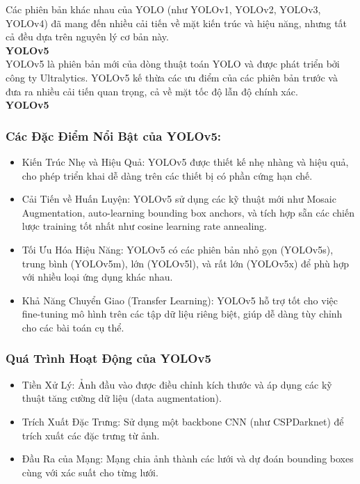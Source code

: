 \begin{flushleft}
\begin{itemize}
    \end{itemize}
    Các phiên bản khác nhau của YOLO (như YOLOv1, YOLOv2, YOLOv3, YOLOv4) đã mang đến nhiều cải tiến về mặt kiến trúc và hiệu năng, nhưng tất cả đều dựa trên nguyên lý cơ bản này.\\
    \textbf{YOLOv5}\\
    YOLOv5 là phiên bản mới của dòng thuật toán YOLO và được phát triển bởi công ty Ultralytics. YOLOv5 kế thừa các ưu điểm của các phiên bản trước và đưa ra nhiều cải tiến quan trọng, cả về mặt tốc độ lẫn độ chính xác.\\
    \textbf{YOLOv5}\\
    \fontsize{13}{20}\selectfont\subsubsection{Các Đặc Điểm Nổi Bật của YOLOv5:}
    \begin{itemize}
        \item Kiến Trúc Nhẹ và Hiệu Quả: YOLOv5 được thiết kế nhẹ nhàng và hiệu quả, cho phép triển khai dễ dàng trên các thiết bị có phần cứng hạn chế.
        \item Cải Tiến về Huấn Luyện: YOLOv5 sử dụng các kỹ thuật mới như Mosaic Augmentation, auto-learning bounding box anchors, và tích hợp sẵn các chiến lược training tốt nhất như cosine learning rate annealing.
        \item Tối Ưu Hóa Hiệu Năng: YOLOv5 có các phiên bản nhỏ gọn (YOLOv5s), trung bình (YOLOv5m), lớn (YOLOv5l), và rất lớn (YOLOv5x) để phù hợp với nhiều loại ứng dụng khác nhau.
        \item Khả Năng Chuyển Giao (Transfer Learning): YOLOv5 hỗ trợ tốt cho việc fine-tuning mô hình trên các tập dữ liệu riêng biệt, giúp dễ dàng tùy chỉnh cho các bài toán cụ thể.
    \end{itemize}
    \fontsize{13}{20}\selectfont\subsubsection{Quá Trình Hoạt Động của YOLOv5}
    \begin{itemize}
        \item Tiền Xử Lý: Ảnh đầu vào được điều chỉnh kích thước và áp dụng các kỹ thuật tăng cường dữ liệu (data augmentation).
        \item Trích Xuất Đặc Trưng: Sử dụng một backbone CNN (như CSPDarknet) để trích xuất các đặc trưng từ ảnh.
        \item Đầu Ra của Mạng: Mạng chia ảnh thành các lưới và dự đoán bounding boxes cùng với xác suất cho từng lưới.

\end{itemize}
\end{flushleft}
